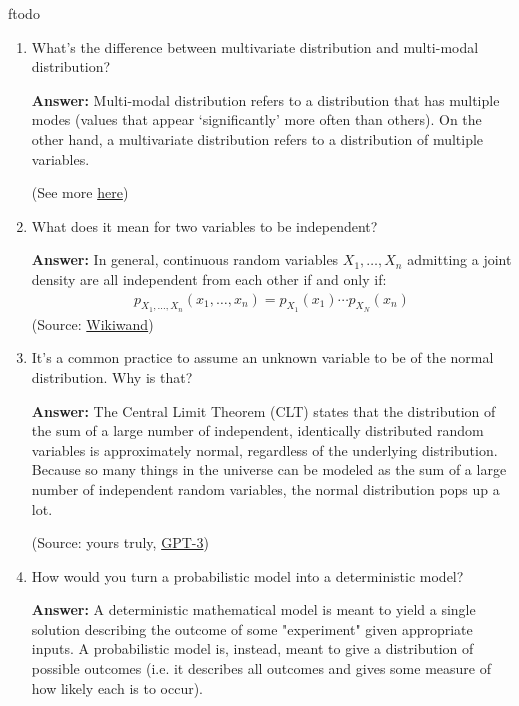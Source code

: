 ƒtodo\documentclass{article}
\newenvironment{QandA}{\begin{enumerate}[label=\arabic*.]}{\end{enumerate}}
\newenvironment{answer}{\par\normalfont \textbf{Answer:}}{}
\begin{document}
\begin{QandA}
    \item What’s the difference between multivariate distribution and multi-modal distribution?
    \begin{answer}
        Multi-modal distribution refers to a distribution that has multiple modes (values that appear `significantly' more often than others). On the other hand, a multivariate distribution refers to a distribution of multiple variables.
        
        (See more \href{https://stats.stackexchange.com/questions/168586/what-is-the-difference-between-multimodal-and-multivariate}{here})
    \end{answer}

    \item What does it mean for two variables to be independent?
    \begin{answer}
        In general, continuous random variables $X_1, \ldots, X_n$ admitting a joint density are all independent from each other if and only if:
        \begin{align*}
            p_{X_1, \ldots, X_n} \left(x_1, \ldots, x_n \right) = p_{X_1}(x_1)\cdots p_{X_N}(x_n)
        \end{align*}
        (Source: \href{https://www.wikiwand.com/en/Probability_density_function#/Independence}{Wikiwand})
    \end{answer}

    \item It’s a common practice to assume an unknown variable to be of the normal distribution. Why is that?
    \begin{answer}
        The Central Limit Theorem (CLT) states that the distribution of the sum of a large number of independent, identically distributed random variables is approximately normal, regardless of the underlying distribution. Because so many things in the universe can be modeled as the sum of a large number of independent random variables, the normal distribution pops up a lot. 
        
        (Source: yours truly, \href{https://twitter.com/joaoli13/status/1530959944064851968}{GPT-3})
    \end{answer}

    \item How would you turn a probabilistic model into a deterministic model?
    \begin{answer}
        A deterministic mathematical model is meant to yield a single solution describing the outcome of some "experiment" given appropriate inputs. A probabilistic model is, instead, meant to give a distribution of possible outcomes (i.e. it describes all outcomes and gives some measure of how likely each is to occur).


\end{answer}
\end{QandA}
\end{document}
